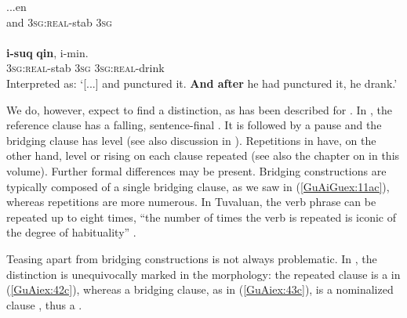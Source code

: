 \documentclass[output=paper]{LSP/langsci}
\begin{document}
\begin{exe}
\ex \label{GuAiex:41ab}
\begin{xlist}
\ex \label{GuAiex:41a}
\gll ...en   \underline{}       \underline{} \\
and   \textsc{3sg:real}-stab   \textsc{3sg}    \\
\glt {} \\

\ex \label{GuAiex:41b}
\gll \textbf{i-suq}       \textbf{qin}, i-min.  \\
\textsc{3sg:real}-stab   \textsc{3sg}   \textsc{3sg:real}-drink\\
\glt {} Interpreted as: `[...] and punctured it. \textbf{And after} he had punctured it, he drank.' \citep[][260]{dimock09}
\end{xlist}
\end{exe}

We do, however, expect to find a  distinction, as has been described for  \citep[][389--391]{schulze73}. In , the reference clause has a falling, sentence-final . It is followed by a pause and the bridging clause has level  (see also discussion in ). Repetitions in  have, on the other hand, level or rising  on each clause repeated (see also the chapter on  in this volume). Further formal differences may be present. Bridging constructions are typically composed of a single bridging clause, as we saw in (\ref{GuAiGuex:11ac}), whereas repetitions are more numerous. In Tuvaluan, the verb phrase can be repeated up to eight times, ``the number of times the verb is repeated is iconic of the degree of habituality'' \citep[][487]{besnier00}.

Teasing apart  from bridging constructions is not always problematic. In , the distinction is unequivocally marked in the morphology: the repeated clause is a  in (\ref{GuAiex:42c}), whereas a bridging clause, as in (\ref{GuAiex:43c}), is a nominalized  clause \citep[][518]{kasia17}, thus a . 
\end{document}
